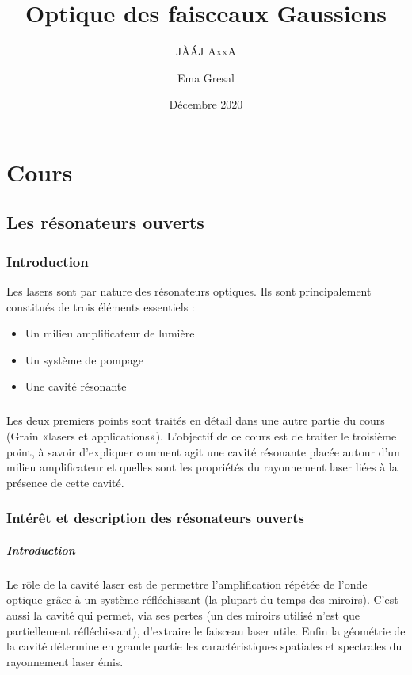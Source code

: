 \documentclass{book}
\title{Optique des faisceaux Gaussiens}
\author{
  JÀÁJ AxxA\\
  \and
  Ema Gresal
}
\date{Décembre 2020}
\begin{document}
\maketitle
\chapter{Cours}
\section{Les résonateurs ouverts}
\subsection{Introduction}
 Les lasers sont par nature des résonateurs optiques. Ils sont principalement constitués de trois éléments essentiels :
\begin{itemize}
    \item Un milieu amplificateur de lumière
    \item Un système de pompage
    \item Une cavité résonante
\end{itemize}
\paragraph{}
Les deux premiers points sont traités en détail dans une autre partie du cours (Grain «lasers et applications»). L'objectif de ce cours est de traiter le troisième point, à savoir d'expliquer comment agit une cavité résonante placée autour d'un milieu amplificateur et quelles sont les propriétés du rayonnement laser liées à la présence de cette cavité. 

\subsection{Intérêt et description des résonateurs ouverts}
\paragraph{Introduction}

Le rôle de la cavité laser est de permettre l'amplification répétée de l'onde optique grâce à un système réfléchissant (la plupart du temps des miroirs). C'est aussi la cavité qui permet, via ses pertes (un des miroirs utilisé n'est que partiellement réfléchissant), d'extraire le faisceau laser utile. Enfin la géométrie de la cavité détermine en grande partie les caractéristiques spatiales et spectrales du rayonnement laser émis.
\end{document}
